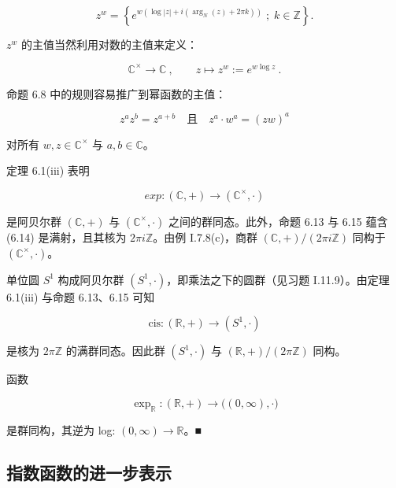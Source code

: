 \[
{z}^{w}=\left\{e^{w(\log|z|+i(\arg_{N}(z)+2\pi k))}\;;\;k\in\mathbb{Z}\right\}.
\]

$ z^{w} $ 的主值当然利用对数的主值来定义：

\[
\mathbb{C}^{\times}\to\mathbb{C}~,\qquad z\mapsto z^{w}:=e^{w\log z}~.
\]

命题 6.8 中的规则容易推广到幂函数的主值：

\begin{equation}
z^{a}z^{b}=z^{a+b}\quad\text{且}\quad z^{a}\cdot w^{a}=(z w)^{a}
\end{equation}

对所有 $ w, z \in \mathbb{C}^\times $ 与 $ a, b \in \mathbb{C} $。

\begin{remark}

\begin{items}
\item

定理 6.1(iii) 表明

\begin{equation}
exp:({\mathbb{C}},+)\to({\mathbb{C}}^{\times},\cdot)
\end{equation}

是阿贝尔群 $(\mathbb{C},+)$ 与 $(\mathbb{C}^{\times},\cdot)$ 之间的群同态。此外，命题 6.13 与 6.15 蕴含 (6.14) 是满射，且其核为 $2\pi i\mathbb{Z}$。由例 I.7.8(c)，商群 $(\mathbb{C},+)/(2\pi i\mathbb{Z})$ 同构于 $(\mathbb{C}^{\times},\cdot)$。

\item

单位圆 $ S^{1} $ 构成阿贝尔群 $ (S^{1}, \cdot) $，即乘法之下的圆群（见习题 I.11.9）。由定理 6.1(iii) 与命题 6.13、6.15 可知

\[
\mathrm{c i s}:(\mathbb{R},+)\to(S^{1},\cdot)
\]

是核为 $ 2\pi\mathbb{Z} $ 的满群同态。因此群 $ (S^1, \cdot) $ 与 $ (\mathbb{R}, +)/(2\pi\mathbb{Z}) $ 同构。

\item

函数

\[
\exp_{\mathbb{R}}:(\mathbb{R},+)\to\big((0,\infty),\cdot\big)
\]

是群同构，其逆为 log: $ (0, \infty) \to \mathbb{R} $。■

\end{items}

\end{remark}

\subsection*{指数函数的进一步表示}

